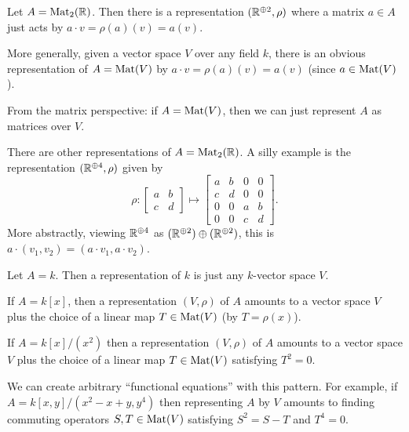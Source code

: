 \begin{example}
	\listhack
	\begin{enumerate}[(a)]
		\ii Let $A = \mathrm{Mat}_2(\mathbb R)$.
		Then there is a representation $(\mathbb R^{\oplus 2}, \rho)$
		where a matrix $a \in A$ just acts by $a \cdot v = \rho(a)(v) = a(v)$.

		\ii More generally, given a vector space $V$ over any field $k$,
		there is an obvious representation of $A = \mathrm{Mat}(V)$
		by $a \cdot v = \rho(a)(v) = a(v)$ (since $a \in \mathrm{Mat}(V)$).

		From the matrix perspective: if $A = \mathrm{Mat}(V)$,
		then we can just represent $A$ as matrices over $V$.

		\ii There are other representations of $A = \mathrm{Mat}_2(\mathbb R)$.
		A silly example is the representation $(\mathbb R^{\oplus 4}, \rho)$ given by
		\[
			\rho :
			\begin{bmatrix} a & b \\ c & d \end{bmatrix}
			\mapsto
			\begin{bmatrix} a & b & 0 & 0 \\ c & d & 0 & 0 \\
				0 & 0 & a & b \\ 0 & 0 & c & d \end{bmatrix} .
		\]
		More abstractly, viewing $\mathbb R^{\oplus 4}$ as
		$(\mathbb R^{\oplus 2}) \oplus (\mathbb R^{\oplus 2})$,
		this is $a \cdot (v_1,v_2) = (a \cdot v_1, a \cdot v_2)$.
	\end{enumerate}
\end{example}

\begin{example}
	\listhack
	\begin{enumerate}[(a)]
		\ii Let $A = k$.
		Then a representation of $k$ is just any $k$-vector space $V$.

		\ii If $A = k[x]$,
		then a representation $(V, \rho)$ of $A$
		amounts to a vector space $V$ plus the choice of
		a linear map $T \in \mathrm{Mat}(V)$ (by $T = \rho(x)$).

		\ii If $A = k[x] / (x^2)$
		then a representation $(V, \rho)$ of $A$
		amounts to a vector space $V$ plus the choice of
		a linear map $T \in \mathrm{Mat}(V)$ satisfying $T^2 = 0$.

		\ii We can create arbitrary ``functional equations'' with this pattern.
		For example, if $A = k[x,y] / (x^2 - x+y, y^4)$
		then representing $A$ by $V$ amounts to finding commuting operators
		$S, T \in \mathrm{Mat}(V)$ satisfying $S^2 = S-T$ and $T^4 = 0$.
	\end{enumerate}
\end{example}

